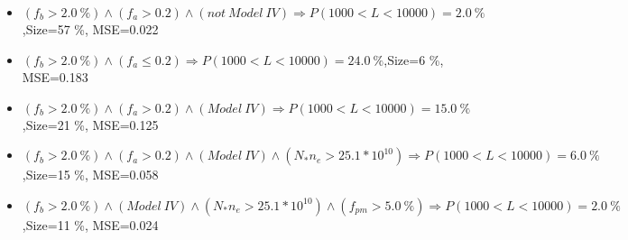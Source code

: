 \documentclass[numbered]{CSL}
\begin{document}
\begin{itemize}
\item $(f_b > 2.0~\%) \land (f_a > 0.2) \land (not~Model~IV) \Rightarrow P(1 000 < L < 10 000) = 2.0~\%$,\hfill Size=57 \%, MSE=0.022
\item $(f_b > 2.0~\%) \land (f_a \leq 0.2) \Rightarrow P(1 000 < L < 10 000) = 24.0~\%$,\hfill Size=6 \%, MSE=0.183
\item $(f_b > 2.0~\%) \land (f_a > 0.2) \land (Model~IV) \Rightarrow P(1 000 < L < 10 000) = 15.0~\%$,\hfill Size=21 \%, MSE=0.125
\item $(f_b > 2.0~\%) \land (f_a > 0.2) \land (Model~IV) \land (N_* n_e > 25.1 * 10^{10}) \Rightarrow P(1 000 < L < 10 000) = 6.0~\%$,\hfill Size=15 \%, MSE=0.058
\item $(f_b > 2.0~\%) \land (Model~IV) \land (N_* n_e > 25.1 * 10^{10}) \land (f_{pm} > 5.0~\%) \Rightarrow P(1 000 < L < 10 000) = 2.0~\%$,\hfill Size=11 \%, MSE=0.024
\end{itemize}
\end{document}

